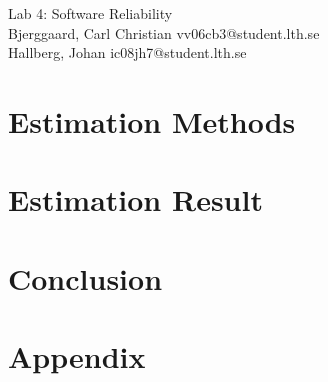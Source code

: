 \documentclass[titlepage]{article}
\begin{document}
\begin{center}
	\huge{Lab 4: Software Reliability } \\
	\small{Bjerggaard, Carl Christian vv06cb3@student.lth.se \\Hallberg, Johan ic08jh7@student.lth.se}

\vspace*{1cm}

\end{center}

\thispagestyle{empty}

\clearpage
\section{Estimation Methods}
\label{methods}


\section{Estimation Result}
\label{results}


\section{Conclusion}
\label{conclusion}

\clearpage
\section*{Appendix}
\label{appendix}

\end{document}

